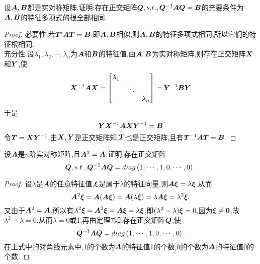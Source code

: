 \documentclass[lang=cn,11pt,normal]{elegantbook}
\begin{document}
	\begin{exercise}
		设$\AA,\BB$都是实对称矩阵,证明:存在正交矩阵$\QQ,s.t.,\QQ^{-1}\AA\QQ=\BB$的充要条件为$\AA,\BB$的特征多项式的根全部相同.
	\end{exercise}
	\begin{proof}
		必要性.若$\TT'\AA\TT=\BB$,即$\AA,\BB$相似,则$\AA,\BB$的特征多项式相同,所以它们的特征根相同.\\
		充分性.设$\lambda_1,\lambda_2,\cdots,\lambda_n$为$\AA$和$\BB$的特征值,由$\AA,\BB$为实对称矩阵,则存在正交矩阵$\XX$和$\YY$,使
		\begin{equation}
		\XX^{-1}\AA\XX=
		\begin{bmatrix}
		\lambda_1&&\\
		&\ddots&\\
		&&\lambda_n
		\end{bmatrix}
		=\YY^{-1}\BB\YY
		\end{equation}
		于是
		\begin{equation}
		\YY\XX^{-1}\AA\XX\YY^{-1}=\BB
		\end{equation}
		令$\TT=\XX\YY^{-1}$,由$\XX,\YY$是正交矩阵知,$\TT$也是正交矩阵,且有$\TT^{-1}\AA\TT=\BB$.
	\end{proof}
	\begin{exercise}
		设$\AA$是$n$阶实对称矩阵,且$\AA^2=\AA$.证明:存在正交矩阵
		\begin{equation}
		\QQ,s.t.,\QQ^{-1}\AA\QQ=diag\left(1,\cdots,1,0,\cdots,0\right).
		\end{equation}
	\end{exercise}
	\begin{proof}
		设$\lambda$是$\AA$的任意特征值,$\bfxi$是属于$\lambda$的特征向量,则$\AA\bfxi=\lambda\bfxi$,从而
		\begin{equation}
		\AA^2\bfxi=\AA(\AA\bfxi)=\AA(\lambda\bfxi)=\lambda\AA\bfxi=\lambda^2\bfxi.
		\end{equation}
		又由于$\AA^2=\AA$,所以有$\lambda^2\bfxi=\AA^2\bfxi=\AA\bfxi=\lambda\bfxi$,即$(\lambda^2-\lambda)\bfxi=0$,因为$\bfxi\ne\boldsymbol{0}$,故$\lambda^2-\lambda=0$,从而$\lambda=0$或1,再由定理7知,存在正交矩阵$\QQ$,使
		\begin{equation}
		\QQ^{-1}\AA\QQ=diag\left(1,\cdots,1,0,\cdots,0\right).
		\end{equation}
		在上式中的对角线元素中,1的个数为$\AA$的特征值1的个数,0的个数为$\AA$的特征值0的个数.
	\end{proof}
\end{document}
